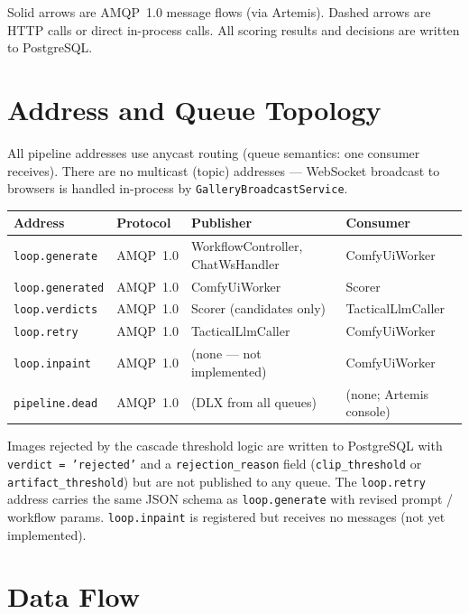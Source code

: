 \documentclass[11pt,letterpaper]{article}
\begin{document}
Solid arrows are AMQP~1.0 message flows (via Artemis). Dashed arrows are
HTTP calls or direct in-process calls. All scoring results and decisions are
written to PostgreSQL.

\section{Address and Queue Topology}

All pipeline addresses use anycast routing (queue semantics: one consumer
receives). There are no multicast (topic) addresses --- WebSocket broadcast
to browsers is handled in-process by \texttt{GalleryBroadcastService}.

\begin{center}
\begin{tabular}{llll}
\toprule
\textbf{Address} & \textbf{Protocol} & \textbf{Publisher} & \textbf{Consumer} \\
\midrule
\texttt{loop.generate}  & AMQP~1.0 & WorkflowController, ChatWsHandler & ComfyUiWorker \\
\texttt{loop.generated} & AMQP~1.0 & ComfyUiWorker                     & Scorer \\
\texttt{loop.verdicts}  & AMQP~1.0 & Scorer (candidates only)          & TacticalLlmCaller \\
\texttt{loop.retry}     & AMQP~1.0 & TacticalLlmCaller                 & ComfyUiWorker \\
\texttt{loop.inpaint}   & AMQP~1.0 & (none — not implemented)          & ComfyUiWorker \\
\texttt{pipeline.dead}  & AMQP~1.0 & (DLX from all queues)             & (none; Artemis console) \\
\bottomrule
\end{tabular}
\end{center}

Images rejected by the cascade threshold logic are written to PostgreSQL
with \texttt{verdict = 'rejected'} and a \texttt{rejection\_reason} field
(\texttt{clip\_threshold} or \texttt{artifact\_threshold}) but are not
published to any queue.
The \texttt{loop.retry} address carries the same JSON schema as
\texttt{loop.generate} with revised prompt / workflow params.
\texttt{loop.inpaint} is registered but receives no messages (not yet implemented).

\section{Data Flow}
\end{document}
